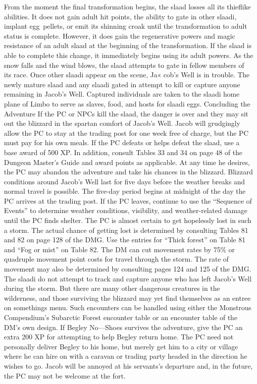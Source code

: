 \documentclass[a5paper,11pt,twoside]{book}
\begin{document}
{{{{From the moment the final transformation begins, the slaad losses all its thieflike abilities.
It does not gain adult hit points, the ability to gate in other slaadi, implant egg~pellets, or emit its shinning croak until the transformation to adult status is complete.
However, it does gain the regenerative powers and magic resistance of an adult slaad at the beginning of the transformation.
If the slaad is able to complete this change, it immediately begins using its adult powers.
As the snow falls and the wind blows, the slaad attempts to gate in fellow members of its race.
Once other slaadi appear on the scene, Ja« cob’s Well is in trouble.
The newly mature slaad and any slaadi gated in attempt to kill or capture anyone remaining in Jacob’s Well.
Captured individuals are taken to the slaadi home plane of Limbo to serve as slaves, food, and hosts for slaadi eggs.
Concluding the Adventure If the PC or NPCs kill the slaad, the danger is over and they may sit out the blizzard in the spartan comfort of Jacob’s Well.
Jacob will grudgingly allow the PC to stay at the trading post for one week free of charge, but the PC must pay for his own meals.
If the PC defeats or helps defeat the slaad, use a base award of 500 XP.
In addition, consult Tables 33 and 34 on page 48 of the Dungeon Master’s Guide and award points as applicable.
At any time he desires, the PC may  abandon the adventure and take his chances in the blizzard.
Blizzard conditions around Jacob’s Well last for five days before the weather breaks and normal travel is possible.
The five-day period begins at midnight of the day the PC arrives at the trading post.
If the PC leaves, continue to use the “Sequence of Events” to determine weather conditions, visibility, and weather-related damage until the PC finds shelter.
The PC is almost certain to get hopelessly lost in such a storm.
The actual chance of getting lost is determined by consulting Tables 81 and 82 on page 128 of the DMG.
Use the entries for “Thick forest” on Table 81 and “Fog or mist” on Table 82.
The DM can cut movement rates by 75\% or quadruple movement point costs for travel through the storm.
The rate of movement may also be determined by consulting pages 124 and 125 of the DMG.
 The slaadi do not attempt to track and capture anyone who has left Jacob’s Well during the storm.
But there are many other dangerous creatures in the wilderness, and those surviving the blizzard may yet find themselves as an entree on somethings menu.
Such encounters can be handled using either the Monstrous Compendium’s Subarctic Forest encounter table or an encounter table of the DM’s own design.
If Begley No—Shoes survives the adventure, give the PC an extra 200 XP for attempting to help Begley return home.
The PC need not personally deliver Begley to his home, but merely get him to a city or village where he can hire on with a caravan or trading party headed in the direction he wishes to go.
Jacob will be annoyed at his servants’s departure and, in the future, the PC may not be welcome at the fort.

}}}}
\end{document}
